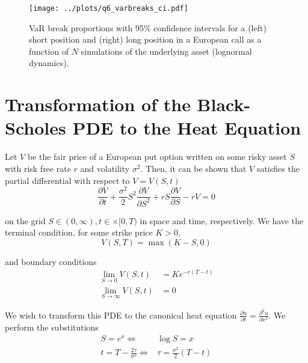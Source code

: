 \documentclass[12pt]{article}
\makeatletter
\let\oldappendix\appendix %
\renewcommand\appendix{%
    \oldappendix
    \newcommand{\section@cntformat}{\appendixname~\thesection\quad}
}
\newlength\tindent
\renewcommand{\indent}{\hspace*{\tindent}}
\makeatother
\begin{document}
\begin{figure}[H]
	\centering
 	\texttt{[image: ../plots/q6\_varbreaks\_ci.pdf]}
\caption{VaR break proportions with 95\% confidence intervals for a (left) short position and (right) long position in a European call as a function of $N$ simulations of the underlying asset (lognormal dynamics).}
\label{fig:varbreaks_ci}
\end{figure}



\newpage
\appendix
\section{Transformation of the Black-Scholes PDE to the Heat Equation}
\small

\indent Let $V$ be the fair price of a European put option written on some risky asset $S$ with risk free rate $r$ and volatility $\sigma^2$. Then, it can be shown that $V$ satisfies the partial differential with respect to $V = V(S, t)$
\begin{equation*}
	\frac{\partial V}{\partial t} + \frac{\sigma^2}{2}S^2\frac{\partial V}{\partial S^2} + rS\frac{\partial V}{\partial S} - rV = 0
\end{equation*}

on the grid $S \in (0,\infty), t \in \times[0, T)$ in space and time, respectively. We have the terminal condition, for some strike price $K > 0$,
\begin{equation*}
	V(S, T) = \max (K - S, 0)
\end{equation*} 

and boundary conditions
\begin{align*}
	\lim_{S\to 0} V(S,t) &= Ke^{-r(T - t)} \\
	\lim_{S\to\infty} V(S,t) &= 0
\end{align*}

We wish to transform this PDE to the canonical heat equation $\frac{\partial u}{\partial t} = \frac{\partial^2 u}{\partial x^2}$. We perform the substitutions
\begin{align*}
	S = e^x \iff& \log S = x \\
	t = T - \frac{2\tau}{\sigma^2} \iff& \tau = \frac{\sigma^2}{2} (T - t)
\end{align*}
\end{document}
